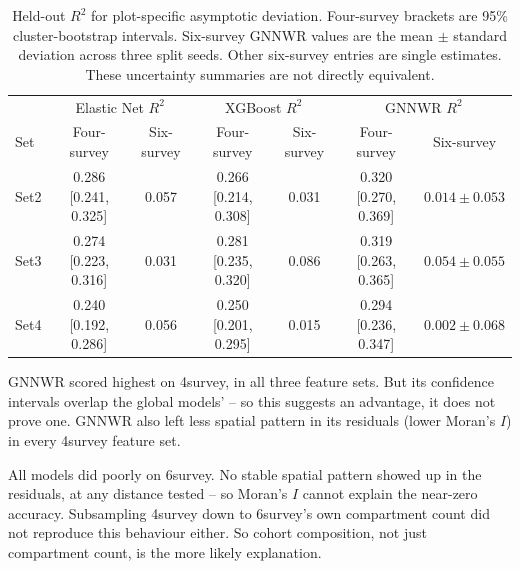 \begin{table}[!htbp]
\centering
\scriptsize
\renewcommand{\arraystretch}{1.1}
\begin{tabular}{lcc|cc|cc}
\toprule
& \multicolumn{2}{c|}{Elastic Net $R^2$}
& \multicolumn{2}{c|}{XGBoost $R^2$}
& \multicolumn{2}{c}{GNNWR $R^2$} \\
Set & Four-survey & Six-survey & Four-survey & Six-survey & Four-survey & Six-survey \\
\midrule
Set2 & 0.286 [0.241, 0.325] & 0.057 & 0.266 [0.214, 0.308] & 0.031
& 0.320 [0.270, 0.369] & $0.014\pm0.053$ \\
Set3 & 0.274 [0.223, 0.316] & 0.031 & 0.281 [0.235, 0.320] & 0.086
& 0.319 [0.263, 0.365] & $0.054\pm0.055$ \\
Set4 & 0.240 [0.192, 0.286] & 0.056 & 0.250 [0.201, 0.295] & 0.015
& 0.294 [0.236, 0.347] & $0.002\pm0.068$ \\
\bottomrule
\end{tabular}
\caption{Held-out $R^2$ for plot-specific asymptotic deviation. Four-survey brackets are 95\%
cluster-bootstrap intervals. Six-survey GNNWR values are the mean $\pm$ standard deviation across
three split seeds. Other six-survey entries are single estimates. These uncertainty summaries are
not directly equivalent.}
\label{tab:results-rq3}
\end{table}

GNNWR scored highest on 4survey, in all three feature sets. But its confidence intervals overlap
the global models' -- so this suggests an advantage, it does not prove one. GNNWR also left less
spatial pattern in its residuals (lower Moran's $I$) in every 4survey feature set.

All models did poorly on 6survey. No stable spatial pattern showed up in the residuals, at any
distance tested -- so Moran's $I$ cannot explain the near-zero accuracy. Subsampling 4survey down
to 6survey's own compartment count did not reproduce this behaviour either. So cohort composition,
not just compartment count, is the more likely explanation.


